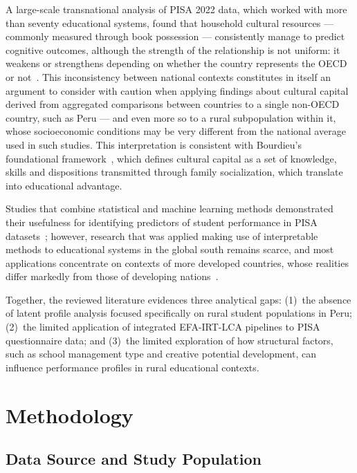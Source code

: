 \documentclass[runningheads]{llncs}
\begin{document}
A large-scale transnational analysis of PISA 2022 data, which
worked with more than seventy educational systems, found that
household cultural resources --- commonly measured through book
possession --- consistently manage to predict cognitive
outcomes, although the strength of the relationship is not
uniform: it weakens or strengthens depending on whether the
country represents the OECD or not~\cite{djekourmane2025capital}.
This inconsistency between national contexts constitutes in
itself an argument to consider with caution when applying
findings about cultural capital derived from aggregated
comparisons between countries to a single non-OECD country, such
as Peru --- and even more so to a rural subpopulation within it,
whose socioeconomic conditions may be very different from the
national average used in such studies. This interpretation is
consistent with Bourdieu's foundational
framework~\cite{bourdieu1986capital}, which defines cultural
capital as a set of knowledge, skills and dispositions
transmitted through family socialization, which translate into
educational advantage.

Studies that combine statistical and machine learning methods
demonstrated their usefulness for identifying predictors of
student performance in PISA
datasets~\cite{soares2024predictors};
however, research that was applied making use of interpretable
methods to educational systems in the global south remains
scarce, and most applications concentrate on contexts of more
developed countries, whose realities differ markedly from those
of developing nations~\cite{delprato2025resilience}.

Together, the reviewed literature evidences three analytical
gaps: (1)~the absence of latent profile analysis focused
specifically on rural student populations in Peru; (2)~the
limited application of integrated EFA-IRT-LCA pipelines to PISA
questionnaire data; and (3)~the limited exploration of how
structural factors, such as school management type and creative
potential development, can influence performance profiles in
rural educational contexts.

\section{Methodology}
\label{sec:method}

\subsection{Data Source and Study Population}
\end{document}
